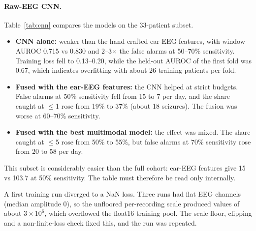 \paragraph{Raw-EEG CNN.} Table~\ref{tab:cnn} compares the models on the 33-patient subset.
\begin{itemize}
\item \textbf{CNN alone:} weaker than the hand-crafted ear-EEG features, with window AUROC 0.715 vs 0.830 and 2--3$\times$ the false alarms at 50--70\% sensitivity. Training loss fell to 0.13--0.20, while the held-out AUROC of the first fold was 0.67, which indicates overfitting with about 26 training patients per fold.
\item \textbf{Fused with the ear-EEG features:} the CNN helped at strict budgets. False alarms at 50\% sensitivity fell from 15 to 7 per day, and the share caught at $\le$1 \FAd{} rose from 19\% to 37\% (about 18 seizures). The fusion was worse at 60--70\% sensitivity.
\item \textbf{Fused with the best multimodal model:} the effect was mixed. The share caught at $\le$5 \FAd{} rose from 50\% to 55\%, but false alarms at 70\% sensitivity rose from 20 to 58 per day.
\end{itemize}
This subset is considerably easier than the full cohort: ear-EEG features give 15 vs 103.7 \FAd{} at 50\% sensitivity. The table must therefore be read only internally.

A first training run diverged to a NaN loss. Three runs had flat EEG channels (median amplitude 0), so the unfloored per-recording scale produced values of about $3\times10^6$, which overflowed the float16 training pool. The scale floor, clipping and a non-finite-loss check fixed this, and the run was repeated.

